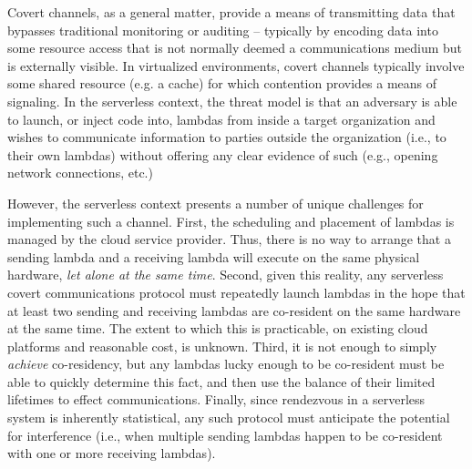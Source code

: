 Covert channels, as a general matter, provide a means of transmitting
data that bypasses traditional monitoring or auditing -- typically by
encoding data into some resource access that is not normally deemed a
communications medium but is externally visible.  In virtualized
environments, covert channels typically involve some shared resource
(e.g. a cache) for which contention provides a means of signaling.
In the serverless context, the threat model is that an adversary is
able to launch, or inject code into, lambdas from inside a target
organization and wishes to communicate information to parties outside
the organization (i.e., to their own lambdas) without offering any
clear evidence of such (e.g., opening network connections, etc.)

However, the serverless context presents a number of unique challenges for
implementing such a channel.  First, the scheduling and placement of lambdas is
managed by the cloud service provider.  Thus, there is no way to arrange that a
sending lambda and a receiving lambda will execute on the same physical
hardware, \emph{let alone at the same time}.  Second, given this reality, any
serverless covert communications protocol must repeatedly launch lambdas in the
hope that at least two sending and receiving lambdas are co-resident on the same
hardware at the same time.  The extent to which this is practicable, on existing
cloud platforms and reasonable cost, is unknown.  Third, it is not enough to
simply \emph{achieve} co-residency, but any lambdas lucky enough to be
co-resident must be able to quickly determine this fact, and then use the
balance of their limited lifetimes to effect communications.  Finally, since
rendezvous in a serverless system is inherently statistical, any such protocol
must anticipate the potential for interference (i.e., when multiple sending
lambdas happen to be co-resident with one or more receiving lambdas).


